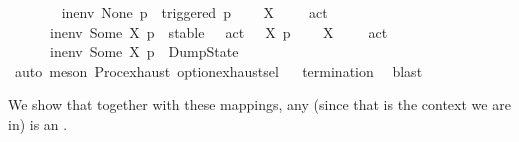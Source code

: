 \begin{isabellebody}
\ \ \ \isanewline
\ \ \ \ {\isacartoucheopen}in{\isacharunderscore}{\kern0pt}env\ None\ p\ {\isacharequal}{\kern0pt}\ triggered\ p{\isacartoucheclose}\isanewline
\ \ {\isacharbar}{\kern0pt}\ {\isacartoucheopen}{\isasymforall}\ {\isasymalpha}{\isasymin}X{\isachardot}{\kern0pt}\ {\isacharparenleft}{\kern0pt}{\isasymexists}\ {\isasymalpha}{\isacharprime}{\kern0pt}{\isachardot}{\kern0pt}\ {\isasymalpha}\ {\isacharequal}{\kern0pt}\ act\ {\isasymalpha}{\isacharprime}{\kern0pt}{\isacharparenright}{\kern0pt}\ {\isasymLongrightarrow}\ \isanewline
\ \ \ \ \ \ in{\isacharunderscore}{\kern0pt}env\ {\isacharparenleft}{\kern0pt}Some\ X{\isacharparenright}{\kern0pt}\ p\ {\isacharequal}{\kern0pt}\ stable\ {\isacharbraceleft}{\kern0pt}{\isasymalpha}{\isacharprime}{\kern0pt}\ {\isachardot}{\kern0pt}\ act\ {\isasymalpha}{\isacharprime}{\kern0pt}\ {\isasymin}\ X{\isacharbraceright}{\kern0pt}\ p{\isacartoucheclose}\isanewline
\ \ {\isacharbar}{\kern0pt}\ {\isacartoucheopen}{\isasymexists}\ {\isasymalpha}{\isasymin}X{\isachardot}{\kern0pt}\ {\isacharparenleft}{\kern0pt}{\isasymnexists}\ {\isasymalpha}{\isacharprime}{\kern0pt}{\isachardot}{\kern0pt}\ {\isasymalpha}\ {\isacharequal}{\kern0pt}\ act\ {\isasymalpha}{\isacharprime}{\kern0pt}{\isacharparenright}{\kern0pt}\ {\isasymLongrightarrow}\ \isanewline
\ \ \ \ \ \ in{\isacharunderscore}{\kern0pt}env\ {\isacharparenleft}{\kern0pt}Some\ X{\isacharparenright}{\kern0pt}\ p\ {\isacharequal}{\kern0pt}\ DumpState{\isacartoucheclose}\isanewline
%
\isadelimproof
\ \ %
\endisadelimproof
%
\isatagproof
{}\isamarkupfalse%
\ {\isacharparenleft}{\kern0pt}auto{\isacharcomma}{\kern0pt}\ meson\ Proc{\isacharunderscore}{\kern0pt}{\isasymtheta}{\isachardot}{\kern0pt}exhaust\ option{\isachardot}{\kern0pt}exhaust{\isacharunderscore}{\kern0pt}sel{\isacharparenright}{\kern0pt}%
\endisatagproof
{\isafoldproof}%
%
\isadelimproof
\isanewline
%
\endisadelimproof
{}\isamarkupfalse%
%
\isadelimproof
\ %
\endisadelimproof
%
\isatagproof
{}\isamarkupfalse%
\ {\isachardoublequoteopen}termination{\isachardoublequoteclose}\ \isamarkupfalse%
\ blast%
\endisatagproof
{\isafoldproof}%
%
\isadelimproof
%
\endisadelimproof
%
\begin{isamarkuptext}%
We show that together with these mappings, any  (since that is the context we are in) is an .%
\end{isamarkuptext}\isamarkuptrue%

\end{isabellebody}
